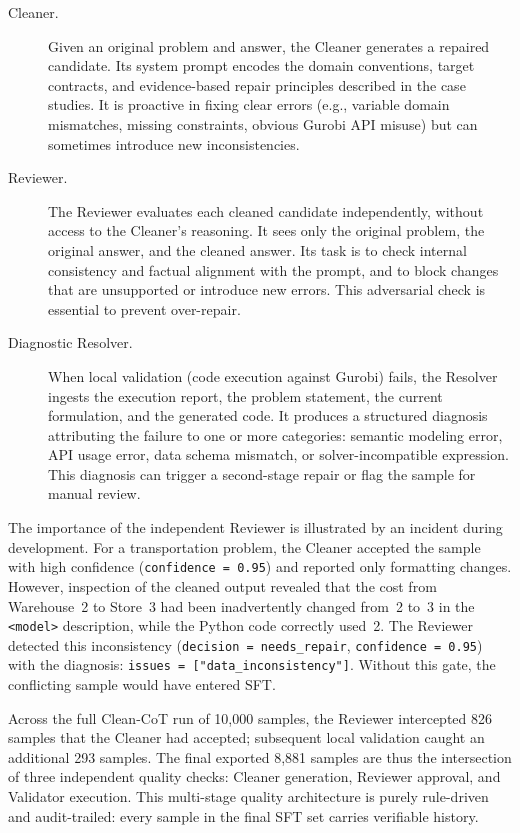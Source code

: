 \begin{description}
    \item[Cleaner.] Given an original problem and answer, the Cleaner generates a repaired candidate. Its system prompt encodes the domain conventions, target contracts, and evidence-based repair principles described in the case studies. It is proactive in fixing clear errors (e.g., variable domain mismatches, missing constraints, obvious Gurobi API misuse) but can sometimes introduce new inconsistencies.

    \item[Reviewer.] The Reviewer evaluates each cleaned candidate independently, without access to the Cleaner's reasoning. It sees only the original problem, the original answer, and the cleaned answer. Its task is to check internal consistency and factual alignment with the prompt, and to block changes that are unsupported or introduce new errors. This adversarial check is essential to prevent over-repair.

    \item[Diagnostic Resolver.] When local validation (code execution against Gurobi) fails, the Resolver ingests the execution report, the problem statement, the current formulation, and the generated code. It produces a structured diagnosis attributing the failure to one or more categories: semantic modeling error, API usage error, data schema mismatch, or solver-incompatible expression. This diagnosis can trigger a second-stage repair or flag the sample for manual review.
\end{description}

The importance of the independent Reviewer is illustrated by an incident during development. For a transportation problem, the Cleaner accepted the sample with high confidence (\texttt{confidence = 0.95}) and reported only formatting changes. However, inspection of the cleaned output revealed that the cost from Warehouse~2 to Store~3 had been inadvertently changed from~2 to~3 in the \texttt{<model>} description, while the Python code correctly used~2. The Reviewer detected this inconsistency (\texttt{decision = needs\_repair}, \texttt{confidence = 0.95}) with the diagnosis: \texttt{issues = ["data\_inconsistency"]}. Without this gate, the conflicting sample would have entered SFT.

Across the full Clean-CoT run of 10,000 samples, the Reviewer intercepted 826 samples that the Cleaner had accepted; subsequent local validation caught an additional 293 samples. The final exported 8,881 samples are thus the intersection of three independent quality checks: Cleaner generation, Reviewer approval, and Validator execution. This multi-stage quality architecture is purely rule-driven and audit-trailed: every sample in the final SFT set carries verifiable history.

